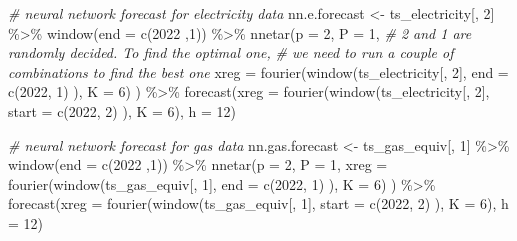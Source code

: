 \documentclass[
]{article}
\newenvironment{Shaded}{\begin{snugshade}}{\end{snugshade}}
\newcommand{\AttributeTok}[1]{\textcolor[rgb]{0.77,0.63,0.00}{#1}}
\newcommand{\CommentTok}[1]{\textcolor[rgb]{0.56,0.35,0.01}{\textit{#1}}}
\newcommand{\DecValTok}[1]{\textcolor[rgb]{0.00,0.00,0.81}{#1}}
\newcommand{\FunctionTok}[1]{\textcolor[rgb]{0.00,0.00,0.00}{#1}}
\newcommand{\NormalTok}[1]{#1}
\newcommand{\OtherTok}[1]{\textcolor[rgb]{0.56,0.35,0.01}{#1}}
\newcommand{\SpecialCharTok}[1]{\textcolor[rgb]{0.00,0.00,0.00}{#1}}
\begin{document}
\begin{Shaded}
\begin{Highlighting}[]
\CommentTok{\# neural network forecast for electricity data}
\NormalTok{nn.e.forecast }\OtherTok{\textless{}{-}}\NormalTok{ ts\_electricity[, }\DecValTok{2}\NormalTok{] }\SpecialCharTok{\%\textgreater{}\%} 
  \FunctionTok{window}\NormalTok{(}\AttributeTok{end =} \FunctionTok{c}\NormalTok{(}\DecValTok{2022}\NormalTok{ ,}\DecValTok{1}\NormalTok{)) }\SpecialCharTok{\%\textgreater{}\%} 
  \FunctionTok{nnetar}\NormalTok{(}\AttributeTok{p =} \DecValTok{2}\NormalTok{, }\AttributeTok{P =} \DecValTok{1}\NormalTok{, }\CommentTok{\# 2 and 1 are randomly decided. To find the optimal one, }
         \CommentTok{\# we need to run a couple of combinations to find the best one}
         \AttributeTok{xreg =} \FunctionTok{fourier}\NormalTok{(}\FunctionTok{window}\NormalTok{(ts\_electricity[, }\DecValTok{2}\NormalTok{], }
                               \AttributeTok{end =} \FunctionTok{c}\NormalTok{(}\DecValTok{2022}\NormalTok{, }\DecValTok{1}\NormalTok{)}
\NormalTok{                               ),}
                        \AttributeTok{K =} \DecValTok{6}\NormalTok{)}
\NormalTok{         ) }\SpecialCharTok{\%\textgreater{}\%} 
  \FunctionTok{forecast}\NormalTok{(}\AttributeTok{xreg =} \FunctionTok{fourier}\NormalTok{(}\FunctionTok{window}\NormalTok{(ts\_electricity[, }\DecValTok{2}\NormalTok{], }
                                 \AttributeTok{start =} \FunctionTok{c}\NormalTok{(}\DecValTok{2022}\NormalTok{, }\DecValTok{2}\NormalTok{)}
\NormalTok{                                 ),}
                          \AttributeTok{K =} \DecValTok{6}\NormalTok{),}
           \AttributeTok{h =} \DecValTok{12}\NormalTok{)}

\CommentTok{\# neural network forecast for gas data}
\NormalTok{nn.gas.forecast }\OtherTok{\textless{}{-}}\NormalTok{ ts\_gas\_equiv[, }\DecValTok{1}\NormalTok{] }\SpecialCharTok{\%\textgreater{}\%} 
  \FunctionTok{window}\NormalTok{(}\AttributeTok{end =} \FunctionTok{c}\NormalTok{(}\DecValTok{2022}\NormalTok{ ,}\DecValTok{1}\NormalTok{)) }\SpecialCharTok{\%\textgreater{}\%} 
  \FunctionTok{nnetar}\NormalTok{(}\AttributeTok{p =} \DecValTok{2}\NormalTok{, }\AttributeTok{P =} \DecValTok{1}\NormalTok{,}
         \AttributeTok{xreg =} \FunctionTok{fourier}\NormalTok{(}\FunctionTok{window}\NormalTok{(ts\_gas\_equiv[, }\DecValTok{1}\NormalTok{], }
                               \AttributeTok{end =} \FunctionTok{c}\NormalTok{(}\DecValTok{2022}\NormalTok{, }\DecValTok{1}\NormalTok{)}
\NormalTok{                               ),}
                        \AttributeTok{K =} \DecValTok{6}\NormalTok{)}
\NormalTok{         ) }\SpecialCharTok{\%\textgreater{}\%} 
  \FunctionTok{forecast}\NormalTok{(}\AttributeTok{xreg =} \FunctionTok{fourier}\NormalTok{(}\FunctionTok{window}\NormalTok{(ts\_gas\_equiv[, }\DecValTok{1}\NormalTok{], }
                                 \AttributeTok{start =} \FunctionTok{c}\NormalTok{(}\DecValTok{2022}\NormalTok{, }\DecValTok{2}\NormalTok{)}
\NormalTok{                                 ),}
                          \AttributeTok{K =} \DecValTok{6}\NormalTok{),}
           \AttributeTok{h =} \DecValTok{12}\NormalTok{)}



\end{Highlighting}
\end{Shaded}
\end{document}
